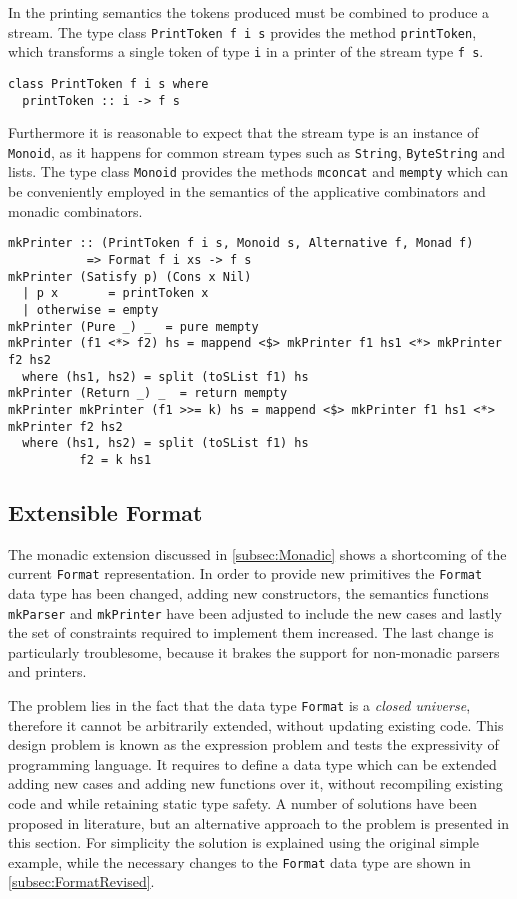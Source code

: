 \documentclass[../Thesis.tex]{subfiles}
\begin{document}
In the printing semantics the tokens produced must be combined to produce a stream. The type class \texttt{PrintToken f i s} provides the
method \texttt{printToken}, which transforms a single token
of type \texttt{i} in a printer of the stream type \texttt{f s}.
\begin{verbatim}
class PrintToken f i s where
  printToken :: i -> f s 
\end{verbatim}

Furthermore it is reasonable to expect that the stream type is 
an instance of \texttt{Monoid}, as it happens for common stream
types such as \texttt{String}, \texttt{ByteString} and lists.
The type class \texttt{Monoid} provides the methods 
\texttt{mconcat} and \texttt{mempty} which can be conveniently employed
in the semantics of the applicative combinators and monadic combinators.

\begin{verbatim}
mkPrinter :: (PrintToken f i s, Monoid s, Alternative f, Monad f) 
           => Format f i xs -> f s
mkPrinter (Satisfy p) (Cons x Nil)
  | p x       = printToken x
  | otherwise = empty
mkPrinter (Pure _) _  = pure mempty
mkPrinter (f1 <*> f2) hs = mappend <$> mkPrinter f1 hs1 <*> mkPrinter f2 hs2
  where (hs1, hs2) = split (toSList f1) hs
mkPrinter (Return _) _  = return mempty
mkPrinter mkPrinter (f1 >>= k) hs = mappend <$> mkPrinter f1 hs1 <*> mkPrinter f2 hs2
  where (hs1, hs2) = split (toSList f1) hs
          f2 = k hs1			
\end{verbatim}

\subsection{Extensible Format}
\label{subsec:ExtensibleFormat}
The monadic extension discussed in \ref{subsec:Monadic} shows a shortcoming of the current \texttt{Format} representation.
In order to provide new primitives the \texttt{Format} data type 
has been changed, adding new constructors, the semantics functions \texttt{mkParser} and \texttt{mkPrinter} have been adjusted to include the new cases and lastly
the set of constraints required to implement them increased.
The last change is particularly troublesome, because it brakes the support for non-monadic parsers and printers.

The problem lies in the fact that the data type \texttt{Format} is
a \emph{closed universe}, therefore it cannot be arbitrarily extended,
without updating existing code.
This design problem is known as the expression problem \cite{Wadler98ExprPr} and tests the expressivity of programming language.
It requires to define a data type which can be extended adding new cases and adding new functions over it, without recompiling existing code and while retaining static type safety.
A number of solutions have been proposed in literature, but an alternative approach to the problem is presented in this section.
For simplicity the solution is explained using the original simple
example, while the necessary changes to the \texttt{Format} data type
are shown in \ref{subsec:FormatRevised}.
\end{document}
